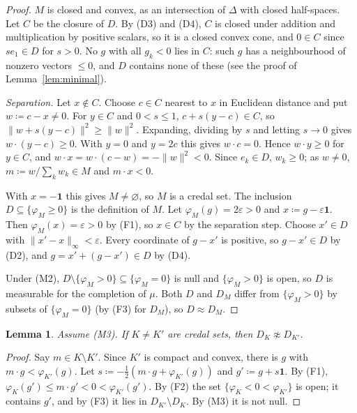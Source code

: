 \documentclass[11pt]{article}
\newtheorem{lemma}[theorem]{Lemma}
\theoremstyle{definition}
\newcommand{\one}{\mathbf 1}
\begin{document}
\begin{proof}
$M$ is closed and convex, as an intersection of $\Delta$ with closed half-spaces. Let $C$ be the closure of $D$. By (D3) and (D4), $C$ is closed under addition and multiplication by positive scalars, so it is a closed convex cone, and $0\in C$ since $se_1\in D$ for $s>0$. No $g$ with all $g_k<0$ lies in $C$: such $g$ has a neighbourhood of nonzero vectors $\le0$, and $D$ contains none of these (see the proof of Lemma~\ref{lem:minimal}).

\emph{Separation.} Let $x\notin C$. Choose $c\in C$ nearest to $x$ in Euclidean distance and put $w\coloneqq c-x\ne0$. For $y\in C$ and $0<s\le1$, $c+s(y-c)\in C$, so $\|w+s(y-c)\|^2\ge\|w\|^2$. Expanding, dividing by $s$ and letting $s\to0$ gives $w\cdot(y-c)\ge0$. With $y=0$ and $y=2c$ this gives $w\cdot c=0$. Hence $w\cdot y\ge0$ for $y\in C$, and $w\cdot x=w\cdot(c-w)=-\|w\|^2<0$. Since $e_k\in D$, $w_k\ge0$; as $w\ne0$, $m\coloneqq w/\sum_kw_k\in M$ and $m\cdot x<0$.

With $x=-\one$ this gives $M\ne\varnothing$, so $M$ is a credal set. The inclusion $D\subseteq\{\varphi_M\ge0\}$ is the definition of $M$. Let $\varphi_M(g)=2\varepsilon>0$ and $x\coloneqq g-\varepsilon\one$. Then $\varphi_M(x)=\varepsilon>0$ by (F1), so $x\in C$ by the separation step. Choose $x'\in D$ with $\|x'-x\|_\infty<\varepsilon$. Every coordinate of $g-x'$ is positive, so $g-x'\in D$ by (D2), and $g=x'+(g-x')\in D$ by (D4).

Under (M2), $D\setminus\{\varphi_M>0\}\subseteq\{\varphi_M=0\}$ is null and $\{\varphi_M>0\}$ is open, so $D$ is measurable for the completion of $\mu$. Both $D$ and $D_M$ differ from $\{\varphi_M>0\}$ by subsets of $\{\varphi_M=0\}$ (by (F3) for $D_M$), so $D\approx D_M$.
\end{proof}

\begin{lemma}\label{lem:injective}
Assume (M3). If $K\ne K'$ are credal sets, then $D_K\not\approx D_{K'}$.
\end{lemma}

\begin{proof}
Say $m\in K\setminus K'$. Since $K'$ is compact and convex, there is $g$ with $m\cdot g<\varphi_{K'}(g)$. Let $s\coloneqq-\frac12(m\cdot g+\varphi_{K'}(g))$ and $g'\coloneqq g+s\one$. By (F1), $\varphi_K(g')\le m\cdot g'<0<\varphi_{K'}(g')$. By (F2) the set $\{\varphi_K<0<\varphi_{K'}\}$ is open; it contains $g'$, and by (F3) it lies in $D_{K'}\setminus D_K$. By (M3) it is not null.
\end{proof}
\end{document}
